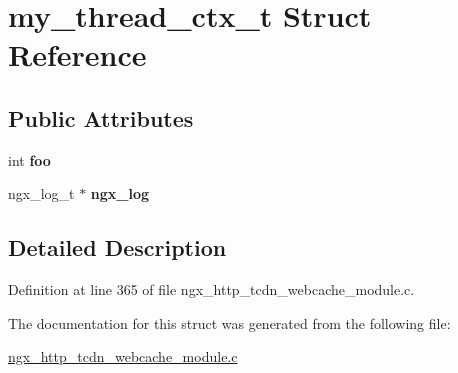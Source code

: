 \hypertarget{structmy__thread__ctx__t}{}\section{my\+\_\+thread\+\_\+ctx\+\_\+t Struct Reference}
\label{structmy__thread__ctx__t}
\subsection*{Public Attributes}
\begin{DoxyCompactItemize}
\item 
int {\bfseries foo}\hypertarget{structmy__thread__ctx__t_a8f738325c1e6d2d9e83fdedf36efe6d3}{}\label{structmy__thread__ctx__t_a8f738325c1e6d2d9e83fdedf36efe6d3}

\item 
ngx\+\_\+log\+\_\+t $\ast$ {\bfseries ngx\+\_\+log}\hypertarget{structmy__thread__ctx__t_a05ed1da7227488ec88a5801574ee5218}{}\label{structmy__thread__ctx__t_a05ed1da7227488ec88a5801574ee5218}

\end{DoxyCompactItemize}


\subsection{Detailed Description}


Definition at line 365 of file ngx\+\_\+http\+\_\+tcdn\+\_\+webcache\+\_\+module.\+c.



The documentation for this struct was generated from the following file\+:\begin{DoxyCompactItemize}
\item 
\hyperlink{ngx__http__tcdn__webcache__module_8c}{ngx\+\_\+http\+\_\+tcdn\+\_\+webcache\+\_\+module.\+c}\end{DoxyCompactItemize}
